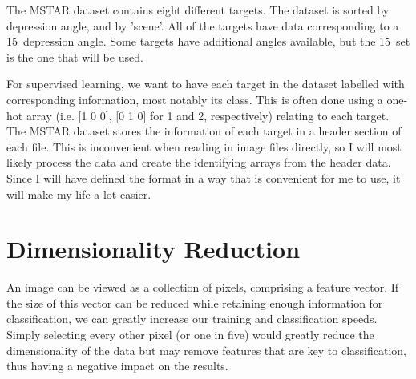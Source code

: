 The MSTAR dataset contains eight different targets. The dataset is sorted by depression angle, and by 'scene'. All of the targets have data corresponding to a 15\degree~depression angle. Some targets have additional angles available, but the 15\degree~set is the one that will be used. 

For supervised learning, we want to have each target in the dataset labelled with corresponding information, most notably its class. This is often done using a one-hot array (i.e. [1 0 0], [0 1 0] for 1 and 2, respectively) relating to each target. The MSTAR dataset stores the information of each target in a header section of each file. This is inconvenient when reading in image files directly, so I will most likely process the data and create the identifying arrays from the header data. Since I will have defined the format in a way that is convenient for me to use, it will make my life a lot easier.

\section{Dimensionality Reduction}
An image can be viewed as a collection of pixels, comprising a feature vector. If the size of this vector can be reduced while retaining enough information for classification, we can greatly increase our training and classification speeds. Simply selecting every other pixel (or one in five) would greatly reduce the dimensionality of the data but may remove features that are key to classification, thus having a negative impact on the results.
